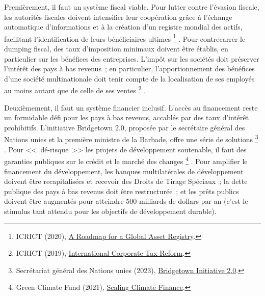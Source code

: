 \documentclass[a5paper,french]{memoir}
\begin{document}
Premièrement, il faut un système fiscal viable. Pour lutter contre l'évasion fiscale, les autorités fiscales doivent intensifier leur coopération grâce à l'échange automatique d'informations et à la création d'un registre mondial des actifs, facilitant l'identification de leurs bénéficiaires ultimes
\footnote{ICRICT (2020), \href{https://static1.squarespace.com/static/5a0c602bf43b5594845abb81/t/5c988368eef1a1538c2ae7eb/1553498989927/GAR.pdf}{A Roadmap for a Global Asset Registry}.}%
. Pour contrecarrer le dumping fiscal, des taux d'imposition minimaux doivent être établis, en particulier sur les bénéfices des entreprises. L'impôt sur les sociétés doit préserver l'intérêt des pays à bas revenus~; en particulier, l'apportionnement des bénéfices d'une société multinationale doit tenir compte de la localisation de ses employés au moins autant que de celle de ses ventes
\footnote{ICRICT (2019), \href{https://static1.squarespace.com/static/5a0c602bf43b5594845abb81/t/5d979e6dc5f7cb7b66842c49/1570217588721/ICRICT-INTERNATIONAL+CORPORATE+TAX+REFORM.pdf}{International Corporate Tax Reform}.}%
. 

Deuxièmement, il faut un système financier inclusif. L'accès au financement reste un formidable défi pour les pays à bas revenus, accablés par des taux d'intérêt prohibitifs. L'initiative Bridgetown 2.0, proposée par le secrétaire général des Nations unies et la première ministre de la Barbade, offre une série de solutions
\footnote{Secrétariat général des Nations unies (2023), \href{https://www.un.org/sustainabledevelopment/blog/2023/04/press-release-with-clock-ticking-for-the-sdgs-un-chief-and-barbados-prime-minister-call-for-urgent-action-to-transform-broken-global-financial-system/}{Bridgetown Initiative 2.0}.}%
. Pour <<~dé-risque~>> les projets de développement soutenable, il faut des garanties publiques sur le crédit et le marché des changes
\footnote{Green Climate Fund (2021), \href{https://www.greenclimate.fund/sites/default/files/document/scaling-climate-finance-context-covid-19-full-report\_0.pdf}{Scaling Climate Finance}.}%
. Pour amplifier le financement du développement, les banques multilatérales de développement doivent être recapitalisées et recevoir des Droits de Tirage Spéciaux~; la dette publique des pays à bas revenus doit être restructurée~; et les prêts publics doivent être augmentés pour atteindre 500 milliards de dollars par an (c'est le stimulus tant attendu pour les objectifs de développement durable). 
\end{document}
